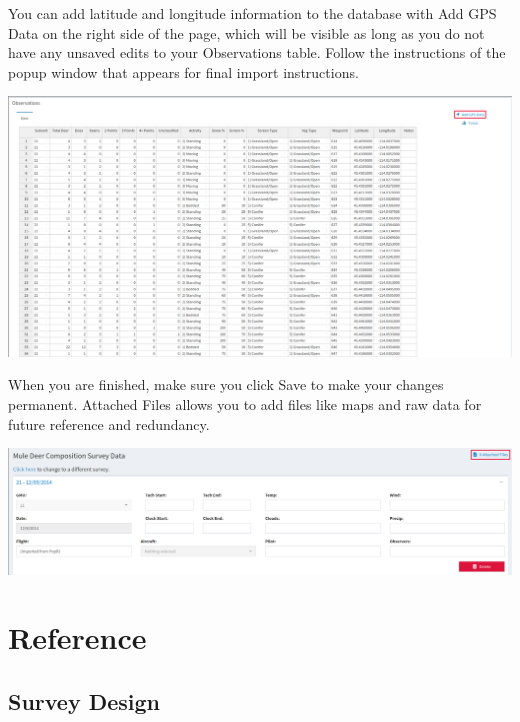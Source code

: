 \documentclass[
]{book}
\begin{document}
You can add latitude and longitude information to the database with {Add GPS Data} on the right side of the page, which will be visible as long as you do not have any unsaved edits to your Observations table. Follow the instructions of the popup window that appears for final import instructions.

\includegraphics{./www/de_walk14.png}

When you are finished, make sure you click {Save} to make your changes permanent. {Attached Files} allows you to add files like maps and raw data for future reference and redundancy.

\includegraphics{./www/de_walk15.png}

\hypertarget{de-ref}{%
\section{Reference}\label{de-ref}}

\hypertarget{de-surdes}{%
\subsection{Survey Design}\label{de-surdes}}
\end{document}
